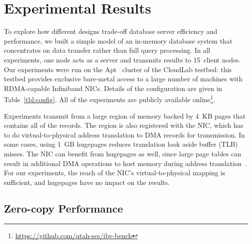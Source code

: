 \section{Experimental Results}
\label{sec:eval}

To explore how different designs trade-off database server efficiency and
performance, we built a simple model of an in-memory database system that
concentrates on data transfer
rather than full query processing.  In all experiments, one node acts
as a server and transmits results to 15~client nodes.
Our experiments were run on the Apt~\cite{Ricci+:OSR15} cluster of the
CloudLab testbed: this testbed provides exclusive bare-metal
access to a large number of machines with RDMA-capable Infiniband NICs.
Details of the configuration are given in Table~\ref{tbl:config}.
All of the experiments are
publicly available online\footnote{\url{https://github.com/utah-scs/ibv-bench}}.



Experiments transmit from a large region of memory backed by 4~KB pages that contains all of
the records.  The region is also
registered with the NIC, which has to do virtual-to-physical address
translation to DMA records for transmission.
In some cases, using 1~GB hugepages reduces translation look aside buffer
(TLB) misses.  The NIC can benefit from
hugepages as well, since large page tables can result in additional
DMA operations to host memory during address translation~\cite{farm,rdma}.  For
our experiments, the reach of the NIC's virtual-to-physical mapping is
sufficient, and hugepages have no impact on the results.

\subsection{Zero-copy Performance}
\label{sec:zero-copy-tput}

%

